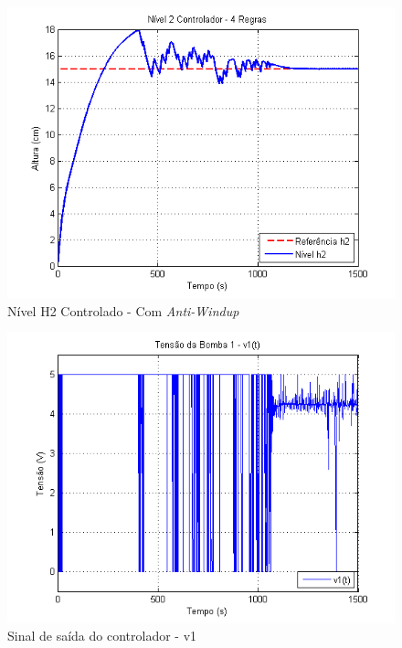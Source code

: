 \begin{figure}[H]
	\centering
	\includegraphics[height=0.35\paperheight, keepaspectratio]{img/nm_ctrl_h2ts2.png}
	\caption{Nível H2 Controlado - Com \textit{Anti-Windup}}
	\label{figH2CtrlTS2_nm}
\end{figure}

\begin{figure}[H]
	\centering
	\includegraphics[height=0.35\paperheight, keepaspectratio]{img/nm_u1_wind.png}
	\caption{\small Sinal de saída do controlador - v1 }
	\label{figNm_u1_wind}
\end{figure}

